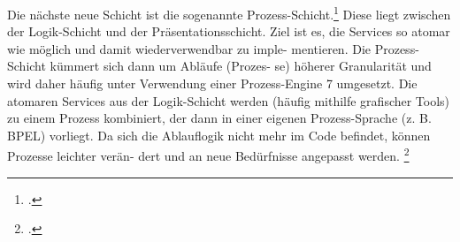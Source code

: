 \documentclass{lehramt-informatik-haupt}
\begin{document}
Die nächste neue Schicht ist die sogenannte
Prozess-Schicht.\footcite[Seite 17]{sosy:fs:4} Diese liegt zwischen der
Logik-Schicht und der Präsentationsschicht. Ziel ist es, die Services so
atomar wie möglich und damit wiederverwendbar zu imple- mentieren. Die
Prozess-Schicht kümmert sich dann um Abläufe (Prozes- se) höherer
Granularität und wird daher häufig unter Verwendung einer Prozess-Engine
7 umgesetzt. Die atomaren Services aus der Logik-Schicht werden (häufig
mithilfe grafischer Tools) zu einem Prozess kombiniert, der dann in
einer eigenen Prozess-Sprache (z. B. BPEL) vorliegt. Da sich die
Ablauflogik nicht mehr im Code befindet, können Prozesse leichter verän-
dert und an neue Bedürfnisse angepasst werden.
\footcite[Seite 214-215]{schatten}

\literatur
\end{document}
